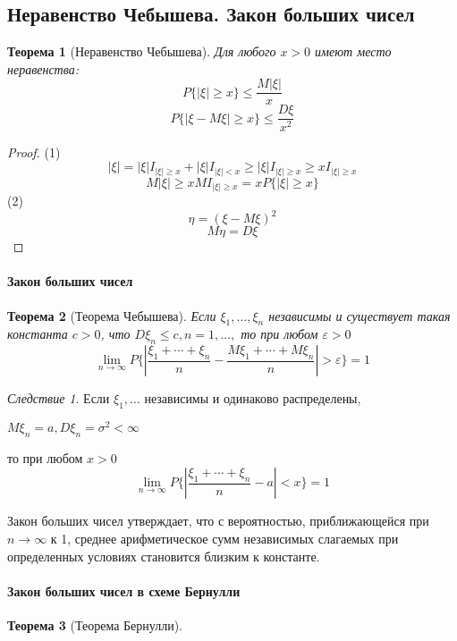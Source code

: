 \documentclass[a4paper]{article}
\newtheorem{theorem}{Теорема}[section]
\theoremstyle{definition}
\theoremstyle{remark}
\newtheorem*{corollary}{Следствие}
\begin{document}
\subsection{Неравенство Чебышева. Закон больших чисел}
\begin{theorem}[Неравенство Чебышева]
    Для любого $x>0$ имеют место неравенства:
    \begin{equation}
        P\{|\xi|\geq x\} \leq \frac{M|\xi|}{x}
    \end{equation}
    \begin{equation}
        P\{|\xi - M\xi| \geq x\} \leq \frac{D \xi}{x^2}
    \end{equation}
\end{theorem}
\begin{proof}
    (1)\[|\xi| = |\xi|I_{|\xi|\ge x}+|\xi|I_{|\xi|< x}\ge |\xi| I_{|\xi| \ge x} \ge x I_{|\xi|\ge x}\]
    \[M|\xi| \ge xM I_{|\xi|\ge x} = x P \{|\xi|\ge x\}\]
    (2)\[\eta = (\xi - M\xi)^2\]
    \[M\eta = D\xi\]
\end{proof}
\paragraph*{Закон больших чисел}
\begin{theorem}[Теорема Чебышева]
    Если $\xi_1, \dots, \xi_n$ независимы и существует такая константа $c > 0$, что $D\xi_n\le c, n = 1, \dots, $ то при любом $\varepsilon > 0$
    \[\lim_{n\to \infty} P\{\left\lvert \frac{\xi_1+\cdots + \xi_n}{n} - \frac{M \xi_1 + \cdots + M \xi_n}{n}\right\rvert  > \varepsilon\} = 1\]
\end{theorem}
\begin{corollary}
    Если $\xi_1, \dots$ независимы и одинаково распределены,

    $M\xi_n = a, D\xi_n = \sigma^2< \infty$

    то при любом $x>0$
    \[\lim_{n\to \infty} P\{\left\lvert \frac{\xi_1+\cdots + \xi_n}{n} - a \right\rvert  < x\} = 1\]
\end{corollary}
Закон больших чисел утверждает, что с вероятностью, приближающейся при $n\to \infty$ к 1, среднее арифметическое сумм независимых слагаемых при определенных условиях становится близким к константе.
\paragraph*{Закон больших чисел в схеме Бернулли}
\begin{theorem}[Теорема Бернулли]
    
\end{theorem}
\end{document}
